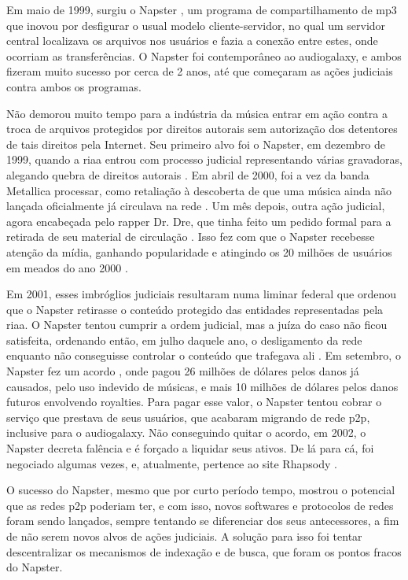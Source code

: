 Em maio de 1999, surgiu o Napster \cite{wiki:napster}, um programa de compartilhamento
de \gls*{mp3} que inovou por desfigurar o usual modelo cliente-servidor, no qual um
servidor central localizava os arquivos nos usuários e fazia a conexão entre estes,
onde ocorriam as transferências. O Napster foi contemporâneo ao \gls*{audiogalaxy}, e
ambos fizeram muito sucesso por cerca de 2 anos, até que começaram as ações judiciais
contra ambos os programas.

Não demorou muito tempo para a indústria da música entrar em ação contra a troca de
arquivos protegidos por direitos autorais sem autorização dos detentores de tais
direitos pela Internet. Seu primeiro alvo foi o Napster, em dezembro de 1999, quando a
\gls{riaa} entrou com processo judicial representando várias gravadoras, alegando
quebra de direitos autorais \cite{site:napster-riaa}. Em abril de 2000, foi a vez da
banda Metallica processar, como retaliação à descoberta de que uma música ainda não
lançada oficialmente já circulava na rede
\cite{site:napster-metallica,site:napster-metallica-orig}. Um mês depois, outra ação
judicial, agora encabeçada pelo rapper Dr. Dre, que tinha feito um pedido formal para a
retirada de seu material de circulação \cite{site:napster-drdre-orig}. Isso fez com que
o Napster recebesse atenção da mídia, ganhando popularidade e atingindo os 20 milhões
de usuários em meados do ano 2000 \cite{site:napster-use-2000}.

Em 2001, esses imbróglios judiciais resultaram numa liminar federal que ordenou que o
Napster retirasse o conteúdo protegido das entidades representadas pela \gls*{riaa}. O
Napster tentou cumprir a ordem judicial, mas a juíza do caso não ficou satisfeita,
ordenando então, em julho daquele ano, o desligamento da rede enquanto não conseguisse
controlar o conteúdo que trafegava ali \cite{wiki:napster}. Em setembro, o Napster fez
um acordo \cite{wiki:napstervsriaa}, onde pagou 26 milhões de dólares pelos danos já
causados, pelo uso indevido de músicas, e mais 10 milhões de dólares pelos danos futuros
envolvendo royalties. Para pagar esse valor, o Napster tentou cobrar o serviço que
prestava de seus usuários, que acabaram migrando de rede \gls*{p2p}, inclusive para o
\gls*{audiogalaxy}. Não conseguindo quitar o acordo, em 2002, o Napster decreta
falência e é forçado a liquidar seus ativos. De lá para cá, foi negociado algumas vezes,
e, atualmente, pertence ao site Rhapsody \cite{site:napster-rhapsody}.

O sucesso do Napster, mesmo que por curto período tempo, mostrou o potencial que as
redes \gls*{p2p} poderiam ter, e com isso, novos softwares e protocolos de redes foram
sendo lançados, sempre tentando se diferenciar dos seus antecessores, a fim de não serem
novos alvos de ações judiciais. A solução para isso foi tentar descentralizar os
mecanismos de indexação e de busca, que foram os pontos fracos do Napster.


